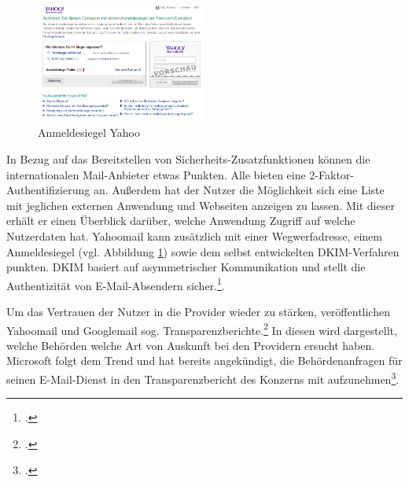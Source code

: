 \documentclass  [paper=a4,
				fontsize=12pt,
				listof=totoc,
				bibliography=totoc
				]{scrreprt}
\begin{document}
			\begin{figure} %
							\includegraphics[width=0.5\textwidth]{images/yahoo_anmeldesiegel.png}
							\caption{Anmeldesiegel Yahoo}
							\label{fig:Yahoo_Anmeldesiegel}	
						\end{figure}
			In Bezug auf das Bereitstellen von Sicherheits-Zusatzfunktionen können die internationalen Mail-Anbieter etwas Punkten. Alle bieten eine 2-Faktor-Authentifizierung an. Außerdem hat der Nutzer die Möglichkeit sich eine Liste mit jeglichen externen Anwendung und Webseiten anzeigen zu lassen. Mit dieser erhält er einen Überblick darüber, welche Anwendung Zugriff auf welche Nutzerdaten hat.
			Yahoomail kann zusätzlich mit einer Wegwerfadresse, einem Anmeldesiegel (vgl. Abbildung \ref{fig:Yahoo_Anmeldesiegel}) sowie dem selbst entwickelten \ac{DKIM}-Verfahren punkten. \ac{DKIM} basiert auf asymmetrischer Kommunikation und stellt die Authentizität von E-Mail-Absendern sicher.\footcite[Vgl.][]{DKIM}.
			
			
			
			\medskip
			
			Um das Vertrauen der Nutzer in die Provider wieder zu stärken, veröffentlichen Yahoomail und Googlemail  sog. Transparenzberichte.\footcite[Vgl.][]{Lokshin} In diesen wird dargestellt, welche Behörden welche Art von Auskunft bei den Providern ersucht haben. Microsoft folgt dem Trend und hat bereits angekündigt, die Behördenanfragen für seinen E-Mail-Dienst in den Transparenzbericht des Konzerns mit aufzunehmen\footcite[Vgl.][]{Herget}.
			\medskip			
		
\end{document}
